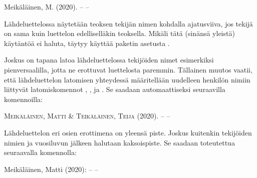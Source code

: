 \begin{tulossis}
  Meikäläinen, M. (2020). -- --
\end{tulossis}

Lähdeluettelossa näytetään teoksen tekijän nimen kohdalla ajatusviiva,
jos tekijä on sama kuin luettelon edelliselläkin teoksella. Mikäli tätä
(sinänsä yleistä) käytäntöä ei haluta, täytyy käyttää paketin asetusta
.

\begin{koodilohkosis}
\usepackage[…, dashed=false]{biblatex}
\end{koodilohkosis}

Joskus on tapana latoa lähdeluettelossa tekijöiden nimet esimerkiksi
pienversaalilla, jotta ne erottuvat luettelosta paremmin. Tällainen
muutos vaatii, että lähdeluettelon latomisen yhteydessä määritellään
uudelleen henkilön nimiin liittyvät latomiskomennot
, ,
 ja . Se saadaan
automaattiseksi seuraavilla komennoilla:

\begin{koodilohkosis}
\end{koodilohkosis}

\begin{tulossis}
  \textsc{Meikäläinen}, \textsc{Matti} \& \textsc{Teikäläinen},
  \textsc{Teija} (2020). -- --
\end{tulossis}

Lähdeluettelon eri osien erottimena on yleensä piste. Joskus kuitenkin
tekijöiden nimien ja vuosiluvun jälkeen halutaan kaksoispiste. Se
saadaan toteutettua seuraavalla komennolla:

\begin{koodilohkosis}
\end{koodilohkosis}

\begin{tulossis}
  Meikäläinen, Matti (2020): -- --
\end{tulossis}


